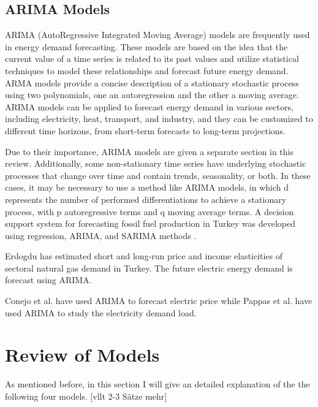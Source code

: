 \documentclass[lettersize,journal]{IEEEtran}
\begin{document}
  \subsection{ARIMA Models}
  ARIMA (AutoRegressive Integrated Moving Average) models are frequently used in energy demand forecasting. These models are based on the idea that the current value of a time series is related to its past values and utilize statistical techniques to model these relationships and forecast future energy demand. ARMA models provide a concise description of a stationary stochastic process using two polynomials, one an autoregression and the other a moving average. ARIMA models can be applied to forecast energy demand in various sectors, including electricity, heat, transport, and industry, and they can be customized to different time horizons, from short-term forecasts to long-term projections.

  Due to their importance, ARIMA models are given a separate section in this review. Additionally, some non-stationary time series have underlying stochastic processes that change over time and contain trends, seasonality, or both. In these cases, it may be necessary to use a method like ARIMA models, in which d represents the number of performed differentiations to achieve a stationary process, with p autoregressive terms and q moving average terms\cite{Box}. A decision support system for forecasting fossil fuel production in Turkey was developed using regression, ARIMA, and SARIMA methods \cite{Ediger 1, Ediger 2}.
 
  Erdogdu\cite{Erdogdu} has estimated short and long-run price and income elasticities of sectoral natural gas demand in Turkey. The future electric energy demand is forecast using ARIMA. 
  

  Conejo et al.\cite{Conejo} have used ARIMA to forecast electric price while Pappas et al.\cite{Pappas} have used ARIMA to study the electricity demand load.
 

\section{Review of Models}

As mentioned before, in this section I will give an detailed explanation of the the following four models. [vllt 2-3 Sätze mehr]
\end{document}

